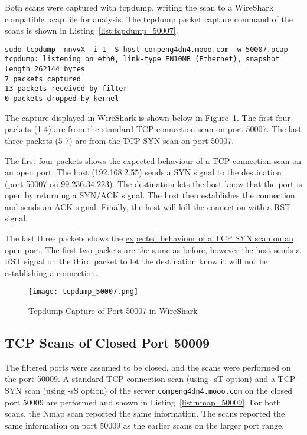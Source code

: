 Both scans were captured with tcpdump, writing the scan to a WireShark compatible pcap file for analysis. The tcpdump packet capture command of the scans is shown in Listing~\ref{list:tcpdump_50007}. 

\begin{lstlisting}[caption=Tcpdump Packet Capture of Scans on Port 50007,label=list:tcpdump_50007]
sudo tcpdump -nnvvX -i 1 -S host compeng4dn4.mooo.com -w 50007.pcap
tcpdump: listening on eth0, link-type EN10MB (Ethernet), snapshot length 262144 bytes
7 packets captured
13 packets received by filter
0 packets dropped by kernel
\end{lstlisting}

The capture displayed in WireShark is shown below in Figure~\ref{fig:wireshark_50007}. The first four packets (1-4) are from the standard TCP connection scan on port 50007. The last three packets (5-7) are from the TCP SYN scan on port 50007.

The first four packets shows the \href{https://nmap.org/book/scan-methods-connect-scan.html#scan-methods-fig-connect-scan-open}{expected behaviour of a TCP connection scan on an open port}. The host (192.168.2.55) sends a SYN signal to the destination (port 50007 on 99.236.34.223). The destination lets the host know that the port is open by returning a SYN/ACK signal. The host then establishes the connection and sends an ACK signal. Finally, the host will kill the connection with a RST signal.

The last three packets shows the \href{https://nmap.org/book/synscan.html#scan-methods-fig-syn-scan-open}{expected behaviour of a TCP SYN scan on an open port}. The first two packets are the same as before, however the host sends a RST signal on the third packet to let the destination know it will not be establishing a connection.

\begin{figure}[htp]
\centering
\caption[tcpdump_50007]{Tcpdump Capture of Port 50007 in WireShark}\label{fig:wireshark_50007}
\texttt{[image: tcpdump\_50007.png]}
\end{figure}


\subsection*{TCP Scans of Closed Port 50009}
The filtered ports were assumed to be closed, and the scans were performed on the port 50009. A standard TCP connection scan (using -sT option) and a TCP SYN scan (using -sS option) of the server \texttt{compeng4dn4.mooo.com} on the closed port 50009 are performed and shown in Listing~\ref{list:nmap_50009}. For both scans, the Nmap scan reported the same information. The scans reported the same information on port 50009 as the earlier scans on the larger port range.

